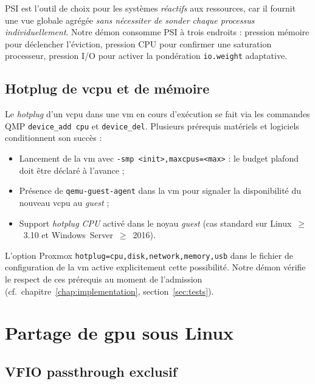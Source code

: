 PSI est l'outil de choix pour les systèmes \emph{réactifs} aux ressources, car il fournit une vue globale agrégée \emph{sans nécessiter de sonder chaque processus individuellement}. Notre démon consomme PSI à trois endroits : pression mémoire pour déclencher l'éviction, pression CPU pour confirmer une saturation processeur, pression I/O pour activer la pondération \texttt{io.weight} adaptative.

\subsection{Hotplug de \acrshort{vcpu} et de mémoire}

Le \emph{hotplug} d'un \acrshort{vcpu} dans une \acrshort{vm} en cours d'exécution se fait via les commandes QMP \texttt{device\_add cpu} et \texttt{device\_del}. Plusieurs prérequis matériels et logiciels conditionnent son succès :

\begin{itemize}[leftmargin=*]
    \item Lancement de la \acrshort{vm} avec \texttt{-smp <init>,maxcpus=<max>} : le \og{}budget plafond\fg{} doit être déclaré à l'avance ;
    \item Présence de \texttt{qemu-guest-agent} dans la \acrshort{vm} pour signaler la disponibilité du nouveau \acrshort{vcpu} au \emph{guest} ;
    \item Support \emph{hotplug CPU} activé dans le noyau \emph{guest} (cas standard sur Linux~$\ge$~3.10 et Windows~Server~$\ge$~2016).
\end{itemize}

L'option Proxmox \texttt{hotplug=cpu,disk,network,memory,usb} dans le fichier de configuration de la \acrshort{vm} active explicitement cette possibilité. Notre démon vérifie le respect de ces prérequis au moment de l'admission (cf.~chapitre~\ref{chap:implementation}, section~\ref{sec:tests}).

\section{Partage de \acrshort{gpu} sous Linux}
\label{sec:gpu-share}

\subsection{VFIO passthrough exclusif}

